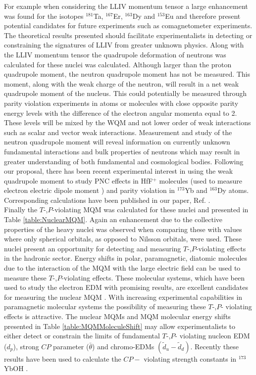 \documentclass[10pt,a4paper, twoside, openright]{report}
\begin{document}
For example when considering the LLIV momentum tensor a large enhancement was found for the isotopes $^{181}$Ta, $^{167}$Er, $^{163}$Dy and $^{153}$Eu and therefore present potential candidates for future experiments such as comagnetometer experiments. The theoretical results presented should facilitate experimentalists in detecting or constraining the signatures of LLIV from greater unknown physics. Along with the LLIV momentum tensor the quadrupole deformation of neutrons was calculated for these nuclei was calculated. Although larger than the proton quadrupole moment, the neutron quadrupole moment has not be measured. This moment, along with the weak charge of the neutron, will result in a net weak quadrupole moment of the nucleus. This could potentially be measured through parity violation experiments in atoms or molecules with close opposite parity energy levels with the difference of the electron angular momenta equal to 2. These levels will be mixed by the WQM and not lower order of weak interactions such as scalar and vector weak interactions. Measurement and study of the neutron quadrupole moment will reveal information on currently unknown fundamental interactions and bulk properties of neutrons which may result in greater understanding of both fundamental and cosmological bodies. Following our proposal, there has been recent experimental interest in using the weak quadrupole moment to study PNC effects in HfF$^{+}$ molecules (used to measure electron electric dipole moment \cite{Cairncross2017}) and parity violation in $^{173}$Yb \cite{Antypas2017} and $^{163}$Dy \cite{Leefer2017} atoms. Corresponding calculations have been published in our paper, Ref. \cite{LFWQM2018}. \\
\linebreak
Finally the $T$-,$P$-violating MQM was calculated for these nuclei and presented in Table \ref{table:NuclearMQM}. Again an enhancement due to the collective properties of the heavy nuclei was observed when comparing these with values where only spherical orbitals, as opposed to Nilsson orbitals, were used. These nuclei present an opportunity for detecting and measuring $T$-,$P$-violating effects in the hadronic sector. Energy shifts in polar, paramagnetic, diatomic molecules due to the interaction of the MQM with the large electric field can be used to measure these $T$-,$P$-violating effects. These molecular systems, which have been used to study the electron EDM with promising results, are excellent candidates for measuring the nuclear MQM  \cite{Skripnikov2017, Skripnikov2014ThO}. With increasing experimental capabilities  in paramagnetic molecular systems the possibility of measuring these $T$-,$P$- violating effects is attractive. The nuclear MQMs and MQM molecular energy shifts presented in Table \ref{table:MQMMoleculeShift} may allow experimentalists to either detect or constrain the limits of fundamental $T$-,$P$- violating nucleon EDM ($d_p$), strong $CP$ parameter ($\bar{\theta}$) and chromo-EDMs $(\tilde{d}_{u} - \tilde{d}_d) $. Recently these results have been used to calculate the $CP-$ violating strength constants in $^{173}$YbOH \cite{MSF2019}.\\
\end{document}
